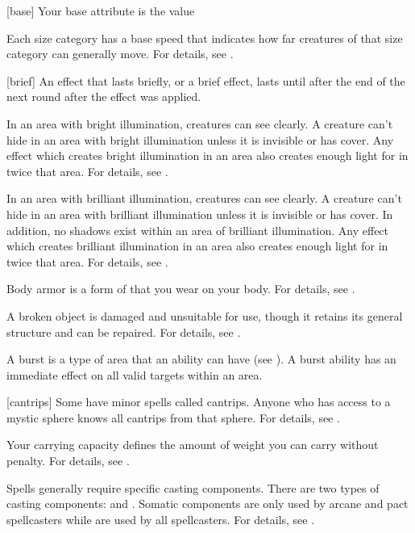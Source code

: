 [base] Your base attribute is the value 

 Each size category has a base speed that indicates how far creatures of that size category can generally move.
For details, see .

[brief] An effect that lasts briefly, or a brief effect, lasts until after the end of the next round after the effect was applied.

 In an area with bright illumination, creatures can see clearly.
A creature can't hide in an area with bright illumination unless it is invisible or has cover.
Any effect which creates bright illumination in an area also creates enough light for  in twice that area.
For details, see .

 In an area with brilliant illumination, creatures can see clearly.
A creature can't hide in an area with brilliant illumination unless it is invisible or has cover.
In addition, no shadows exist within an area of brilliant illumination.
Any effect which creates brilliant illumination in an area also creates enough light for  in twice that area.
For details, see .

 Body armor is a form of  that you wear on your body.
For details, see .

 A broken object is damaged and unsuitable for use, though it retains its general structure and can be repaired.
For details, see .

 A burst is a type of area that an ability can have (see ).
A burst ability has an immediate effect on all valid targets within an area.

[cantrips] Some  have minor spells called cantrips.
Anyone who has access to a mystic sphere knows all cantrips from that sphere.
For details, see .

 Your carrying capacity defines the amount of weight you can carry without penalty.
For details, see .

 Spells generally require specific casting components.
There are two types of casting components:  and .
Somatic components are only used by arcane and pact spellcasters while  are used by all spellcasters.
For details, see .

